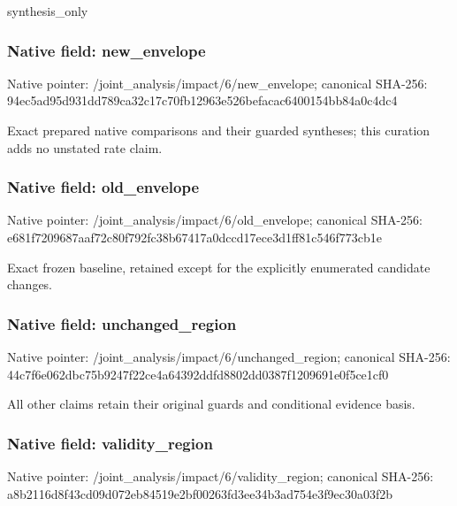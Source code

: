 \documentclass[10pt,a4paper]{article}
\begin{document}
\begingroup\raggedright\sloppy synthesis\_\allowbreak{}only\par\endgroup

\subsubsection{Native field: new\_\allowbreak{}envelope}
Native pointer: /joint\_\allowbreak{}analysis/impact/6/new\_\allowbreak{}envelope; canonical SHA-256: 94ec5ad95d931dd789ca32c17c70fb12963e526befacac6400154bb84a0c4dc4

\begingroup\raggedright\sloppy Exact prepared native comparisons and their guarded syntheses;\allowbreak{} this curation adds no unstated rate claim.\par\endgroup

\subsubsection{Native field: old\_\allowbreak{}envelope}
Native pointer: /joint\_\allowbreak{}analysis/impact/6/old\_\allowbreak{}envelope; canonical SHA-256: e681f7209687aaf72c80f792fc38b67417a0dccd17ece3d1ff81c546f773cb1e

\begingroup\raggedright\sloppy Exact frozen baseline,\allowbreak{} retained except for the explicitly enumerated candidate changes.\par\endgroup

\subsubsection{Native field: unchanged\_\allowbreak{}region}
Native pointer: /joint\_\allowbreak{}analysis/impact/6/unchanged\_\allowbreak{}region; canonical SHA-256: 44c7f6e062dbc75b9247f22ce4a64392ddfd8802dd0387f1209691e0f5ce1cf0

\begingroup\raggedright\sloppy All other claims retain their original guards and conditional evidence basis.\par\endgroup

\subsubsection{Native field: validity\_\allowbreak{}region}
Native pointer: /joint\_\allowbreak{}analysis/impact/6/validity\_\allowbreak{}region; canonical SHA-256: a8b2116d8f43cd09d072eb84519e2bf00263fd3ee34b3ad754e3f9ec30a03f2b
\end{document}

